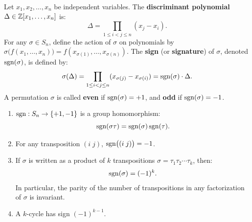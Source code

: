 \begin{definition}
Let $x_1, x_2, \dots, x_n$ be independent variables. The \textbf{discriminant polynomial} $\Delta \in \mathbb{Z}[x_1, \dots, x_n]$ is:
\begin{equation}
\Delta = \prod_{1 \le i < j \le n} (x_j - x_i).
\end{equation}
For any $\sigma \in S_n$, define the action of $\sigma$ on polynomials by $\sigma\bigl(f(x_1, \dots, x_n)\bigr) = f(x_{\sigma(1)}, \dots, x_{\sigma(n)})$.
The \textbf{sign} (or \textbf{signature}) of $\sigma$, denoted $\operatorname{sgn}(\sigma)$, is defined by:
\begin{equation}
\sigma(\Delta) = \prod_{1 \le i < j \le n} (x_{\sigma(j)} - x_{\sigma(i)}) = \operatorname{sgn}(\sigma) \cdot \Delta.
\end{equation}
A permutation $\sigma$ is called \textbf{even} if $\operatorname{sgn}(\sigma) = +1$, and \textbf{odd} if $\operatorname{sgn}(\sigma) = -1$.
\end{definition}

\begin{theorem}
\label{thm:sign_map}
\begin{enumerate}[label=\textbf{(\roman*)}, leftmargin=*, itemsep=4pt]
    \item $\operatorname{sgn}: S_n \to \{+1, -1\}$ is a group homomorphism:
    \begin{equation}
    \operatorname{sgn}(\sigma \tau) = \operatorname{sgn}(\sigma)\operatorname{sgn}(\tau).
    \end{equation}
    \item For any transposition $(i \; j)$, $\operatorname{sgn}\bigl((i \; j)\bigr) = -1$.
    \item If $\sigma$ is written as a product of $k$ transpositions $\sigma = \tau_1 \tau_2 \cdots \tau_k$, then:
    \begin{equation}
    \operatorname{sgn}(\sigma) = (-1)^k.
    \end{equation}
    In particular, the parity of the number of transpositions in any factorization of $\sigma$ is invariant.
    \item A $k$-cycle has sign $(-1)^{k-1}$.
\end{enumerate}
\end{theorem}

